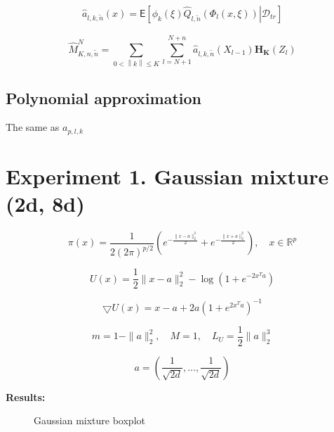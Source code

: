 \documentclass[a4paper]{article}
\begin{document}
\begin{eqnarray*}
\widehat a_{l,k, \tilde{n}}(x)=\mathsf{E}\left[\left.\phi_k\left(\xi\right)\widehat Q_{l, \tilde{n}}\left(\Phi_l(x,\xi)\right)\right | \mathcal{D}_{tr}\right]
\end{eqnarray*}



\[{\widehat  M}_{K,n, \tilde{n}}^N = \sum_{0<\left\| k\right\| \leq K} \sum_{l=N+1}^{N+n}
\widehat a_{l,k, \tilde{n}}(X_{l-1})\mathbf{H_K}(Z_l) \]

\subsection{Polynomial approximation}
The same as $a_{p,l,k}$
\section{Experiment 1. Gaussian mixture (2d, 8d)}

\[ \pi(x) = \frac{1}{2(2\pi)^{p/2}} \left( e^{-\frac{\| x-a\|_2^2}{2}} + e^{-\frac{\| x+a\|_2^2}{2}}\right), \quad x\in \mathbb{R}^p\]

\[U(x) = \frac{1}{2} \| x-a\|_2^2 - \log(1+e^{-2x^Ta})\]

\[ \bigtriangledown U(x) = x-a + 2a(1+e^{2x^Ta})^{-1} \]

\[m = 1- \| a\|_2^2, \quad M = 1, \quad L_U = \frac{1}{2} \| a\|_2^3\]

\[ a = (\frac{1}{\sqrt{2d}}, \dots, \frac{1}{\sqrt{2d}})\]

\textbf{Results:}


\begin{figure}[h]
\centering
{}
\qquad
{}
\caption{Gaussian mixture boxplot}
\end{figure}
\end{document}
